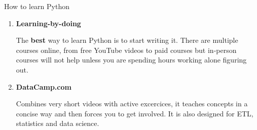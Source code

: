 \documentclass[aspectratio=169]{beamer}
\begin{document}
\begin{frame}{How to learn Python}

\begin{enumerate}

\item \textbf{Learning-by-doing}

		The \textbf{best} way to learn Python is to start writing it. There are multiple courses online, from free YouTube videos to paid courses but in-person courses will not help unless you are spending hours working alone figuring out.
		
\item \textbf{DataCamp.com}
	
		Combines very short videos with active excercices, it teaches concepts in a concise way and then forces you to get involved. It is also designed for ETL, statistics and data science. 

	
\end{enumerate}
\end{frame}
\end{document}
